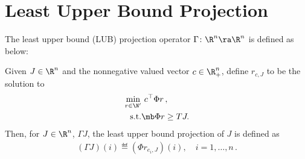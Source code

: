 \section{Least Upper Bound Projection}\label{sec:lubp}
\begin{comment}
Let $e_j$ denote the $j$th basis vector in the standard Euclidean bases of $\R^n$.
We make the following assumption on $\N$:
\begin{assumption}
\label{ass:n}
The set $\N$ satisfies the following conditions:
\begin{enumerate}[(i)]
\item \label{ass:n1}
For any $t\in \R$, $t e_1 + \N \eqdef \{ r + t e_1 \,:\, r\in \N \} = \N$, i.e., 
$\N$ is invariant to shifts by vectors of the form $t e_1$.
\item \label{ass:n2}
For $2\le i \le k$, $\sup_{r\in \N} | e_i^\top r | <+\infty$.
\item \label{ass:n3}
For each $1\le i \le n$, there exists a solution $r_i\in \R^k$ to the ALP \eqref{alp} with $c = e_i$ such that
$r_i\in \N$.
\item \label{ass:n4}
For each $1\le i \le n$, there exists a solution $r_i\in \R^k$ to the GRLP \eqref{grlp} with $c = e_i$ such that
$r_i\in \N$.
\end{enumerate}
\end{assumption}
Recalling that the first column vector of $\Phi$ is $\one$, \eqref{ass:n1} implies that $\{\Phi r \,:\,r\in \N \}$ is invariant to shifts by constants, a property that will prove to be useful.
Part~\eqref{ass:n2} is required to guarantee that solutions to the LPs we define below are bounded.
To satisfy \eqref{ass:n2}, \eqref{ass:n3} and \eqref{ass:n4} 
simultaneously, it is enough to select $\N$ to be contained in 
$\{ r = (r_1,\dots,r_k)^\top \in \R^k \,:\, \max_{2\le i \le k} |r_i| \le r_{\max} \}$ with $r_{\max}>0$ sufficiently large.
\todoc{Can we calculate an a priori bound on how $r_{\max}$ should be? It is a major weakness if we cannot
suggest a way to define $\N$.}
\end{comment}
The least upper bound (LUB) projection operator $\Gamma \colon \R^n \ra\R^n$ is defined as below:
\begin{definition}\label{lubpop}
Given $J\in \R^n$ and the nonnegative valued vector $c\in \R^n_+$, define $r_{c,J}$ to be the solution to 
\begin{align}
\label{lubplp}
\begin{split}
 \underset{r\in \N'}{\min} &\,\, c^\top \Phi r\,,\\
 \text{s.t.}& \mb \Phi r\geq  TJ.
 \end{split}
\end{align}
Then, for $J\in \R^n$, $\Gamma J$,
the least upper bound projection of $J$ is defined as 
\begin{align}\label{gamdef}
(\Gamma J)(i)\eqdef(\Phi r_{e_i,J})(i),\quad i=1,\ldots,n\,.
\end{align}
\end{definition}
